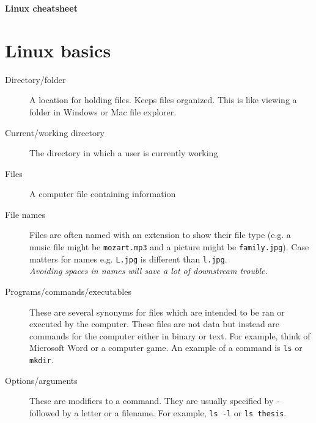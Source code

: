 \documentclass[12pt]{article}
\begin{document}
\begin{center}
\Large{\textbf{Linux cheatsheet}}\\
\end{center}

\section*{Linux basics}
\begin{description}
\item[Directory/folder] A location for holding files. Keeps files organized. This is like viewing a folder in Windows or Mac file explorer.
\item[Current/working directory] The directory in which a user is currently working 
\item[Files] A computer file containing information
\item[File names] Files are often named with an extension to show their file type (e.g. a music file might be \texttt{mozart.mp3} and a picture might be \texttt{family.jpg}). Case matters for names e.g. \texttt{L.jpg} is different than \texttt{l.jpg}. \\\emph{Avoiding spaces in names will save a lot of downstream trouble. }
\item[Programs/commands/executables] These are several synonyms for files which are intended to be ran or executed by the computer. These files are not data but instead are commands for the computer either in binary or text. For example, think of Microsoft Word or a computer game. An example of a command is \texttt{ls} or \texttt{mkdir}.
\item[Options/arguments] These are modifiers to a command. They are usually specified by \texttt{-} followed by a letter or a filename. For example, \texttt{ls -l} or \texttt{ls thesis}.
\end{description}
\end{document}
